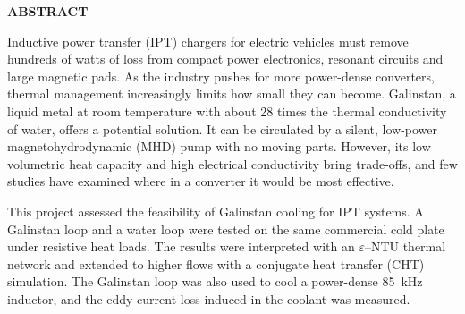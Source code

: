 \thispagestyle{front}
\begingroup
\setlength{\parindent}{0pt}
\setlength{\parskip}{9pt}

\vspace*{1em}

\begin{center}
\textbf{\large \MakeUppercase{\reporttitle}}
\end{center}

\vspace{2em}

\begin{center}
\textbf{\large \reportauthor}
\end{center}

\vspace{2em}

\begin{center}
\textbf{\large ABSTRACT}
\end{center}

Inductive power transfer (IPT) chargers for electric vehicles must remove
hundreds of watts of loss from compact power electronics, resonant circuits and
large magnetic pads. As the industry
pushes for more power-dense converters, thermal management increasingly limits
how small they can become. Galinstan, a liquid metal at room temperature with
about 28 times the thermal conductivity of water, offers a potential solution. It
can be circulated by a silent, low-power magnetohydrodynamic (MHD) pump with no
moving parts. However, its low volumetric heat capacity and high electrical
conductivity bring trade-offs, and few studies have examined where in a converter
it would be most effective.

This project assessed the feasibility of Galinstan cooling for IPT systems. A
Galinstan loop and a water loop were tested on the same commercial cold plate
under resistive heat loads. The results were interpreted with an
$\varepsilon$--NTU thermal network and extended to higher flows with a conjugate
heat transfer (CHT) simulation. The Galinstan loop was also used to cool a
power-dense \SI{85}{\kilo\hertz} inductor, and the eddy-current loss induced in
the coolant was measured.

